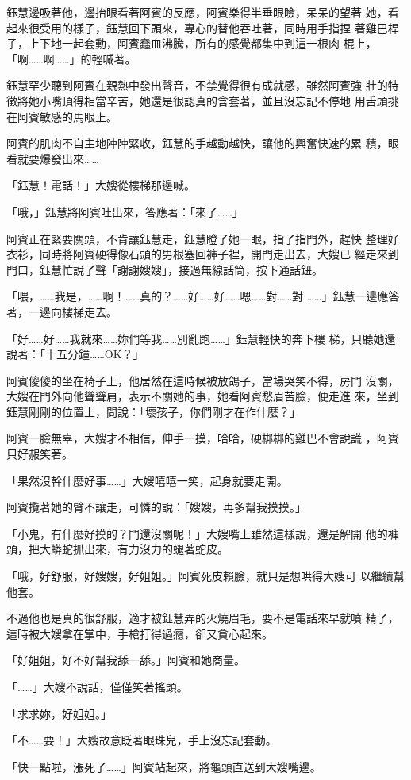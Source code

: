 鈺慧邊吸著他，邊抬眼看著阿賓的反應，阿賓樂得半垂眼瞼，呆呆的望著
她，看起來很受用的樣子，鈺慧回下頭來，專心的替他吞吐著，同時用手指捏
著雞巴桿子，上下地一起套動，阿賓蠢血沸騰，所有的感覺都集中到這一根肉
棍上，「啊……啊……」的輕喊著。

鈺慧罕少聽到阿賓在親熱中發出聲音，不禁覺得很有成就感，雖然阿賓強
壯的特徵將她小嘴頂得相當辛苦，她還是很認真的含套著，並且沒忘記不停地
用舌頭挑在阿賓敏感的馬眼上。

阿賓的肌肉不自主地陣陣緊收，鈺慧的手越動越快，讓他的興奮快速的累
積，眼看就要爆發出來……

「鈺慧！電話！」大嫂從樓梯那邊喊。

「哦，」鈺慧將阿賓吐出來，答應著：「來了……」

阿賓正在緊要關頭，不肯讓鈺慧走，鈺慧瞪了她一眼，指了指門外，趕快
整理好衣衫，同時將阿賓硬得像石頭的男根塞回褲子裡，開門走出去，大嫂已
經走來到門口，鈺慧忙說了聲「謝謝嫂嫂」，接過無線話筒，按下通話鈕。

「喂，……我是，……啊！……真的？……好……好……嗯……對……對
……」鈺慧一邊應答著，一邊向樓梯走去。

「好……好……我就來……妳們等我……別亂跑……」鈺慧輕快的奔下樓
梯，只聽她還說著：「十五分鐘……OK？」

阿賓傻傻的坐在椅子上，他居然在這時候被放鴿子，當場哭笑不得，房門
沒關，大嫂在門外向他聳聳肩，表示不關她的事，她看阿賓愁眉苦臉，便走進
來，坐到鈺慧剛剛的位置上，問說：「壞孩子，你們剛才在作什麼？」

阿賓一臉無辜，大嫂才不相信，伸手一摸，哈哈，硬梆梆的雞巴不會說謊
，阿賓只好赧笑著。

「果然沒幹什麼好事……」大嫂嘻嘻一笑，起身就要走開。

阿賓攬著她的臂不讓走，可憐的說：「嫂嫂，再多幫我摸摸。」

「小鬼，有什麼好摸的？門還沒關呢！」大嫂嘴上雖然這樣說，還是解開
他的褲頭，把大蟒蛇抓出來，有力沒力的螁著蛇皮。

「哦，好舒服，好嫂嫂，好姐姐。」阿賓死皮賴臉，就只是想哄得大嫂可
以繼續幫他套。

不過他也是真的很舒服，適才被鈺慧弄的火燒眉毛，要不是電話來早就噴
精了，這時被大嫂拿在掌中，手槍打得過癮，卻又貪心起來。

「好姐姐，好不好幫我舔一舔。」阿賓和她商量。

「……」大嫂不說話，僅僅笑著搖頭。

「求求妳，好姐姐。」

「不……要！」大嫂故意眨著眼珠兒，手上沒忘記套動。

「快一點啦，漲死了……」阿賓站起來，將龜頭直送到大嫂嘴邊。

